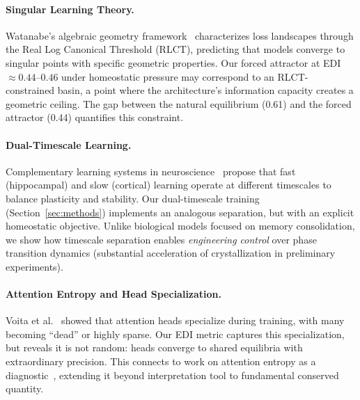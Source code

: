 \paragraph{Singular Learning Theory.}
Watanabe's algebraic geometry framework~\cite{watanabe2009algebraic} characterizes loss landscapes through the Real Log Canonical Threshold (RLCT), predicting that models converge to singular points with specific geometric properties. Our forced attractor at EDI $\approx 0.44$--$0.46$ under homeostatic pressure may correspond to an RLCT-constrained basin, a point where the architecture's information capacity creates a geometric ceiling. The gap between the natural equilibrium (0.61) and the forced attractor (0.44) quantifies this constraint.
\paragraph{Dual-Timescale Learning.}
Complementary learning systems in neuroscience~\cite{mcclelland1995complementary} propose that fast (hippocampal) and slow (cortical) learning operate at different timescales to balance plasticity and stability. Our dual-timescale training (Section~\ref{sec:methods}) implements an analogous separation, but with an explicit homeostatic objective. Unlike biological models focused on memory consolidation, we show how timescale separation enables \textit{engineering control} over phase transition dynamics (substantial acceleration of crystallization in preliminary experiments).

\paragraph{Attention Entropy and Head Specialization.}
Voita et al.~\cite{voita2019analyzing} showed that attention heads specialize during training, with many becoming ``dead'' or highly sparse. Our EDI metric captures this specialization, but reveals it is not random: heads converge to shared equilibria with extraordinary precision. This connects to work on attention entropy as a diagnostic~\cite{jain2019attention}, extending it beyond interpretation tool to fundamental conserved quantity.
